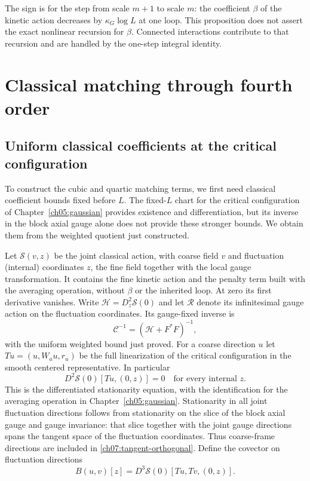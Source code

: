 The sign is for the step from scale $m+1$ to scale $m$: the coefficient $\beta$ of the
kinetic action decreases by $\kappa_G\log L$ at one loop.
This proposition does not assert the exact nonlinear recursion for
$\beta$. Connected interactions contribute to that recursion and are
handled by the one-step integral identity.

\section{Classical matching through fourth order}\label{ch07:classical}

\subsection{Uniform classical coefficients at the critical configuration}
\label{ch07:classical-uniform}

To construct the cubic and quartic matching terms, we first need
classical coefficient bounds fixed before $L$. The fixed-$L$ chart for the critical configuration of
Chapter~\ref{ch05:gaussian} provides existence and differentiation, but
its inverse in the block axial gauge alone does not provide these stronger bounds.
We obtain them from the weighted quotient just constructed.

Let $\mathscr S(v,z)$ be the joint classical action, with coarse field
$v$ and fluctuation (internal) coordinates $z$, the fine field together with the local gauge transformation. It contains the fine
kinetic action and the penalty term built with the averaging operation, without $\beta$ or the
inherited loop. At zero its first derivative vanishes. Write
$\mathscr H=D_z^2\mathscr S(0)$ and let $\mathcal R$ denote its
infinitesimal gauge action on the fluctuation coordinates. Its gauge-fixed inverse is
\[
 \mathscr C^{-1}=(\mathscr H+F^*F)^{-1},
\]
with the uniform weighted bound just proved. For a coarse direction $u$
let $T u=(u,W_a u,r_u)$ be the full linearization of the critical configuration in the smooth
centered representative. In particular
\begin{equation}\label{ch07:tangent-orthogonal}
 D^2\mathscr S(0)[Tu,(0,z)]=0
 \quad\text{for every internal }z.
\end{equation}
This is the differentiated stationarity equation, with the
identification for the averaging operation in Chapter~\ref{ch05:gaussian}. Stationarity
in all joint fluctuation directions follows from stationarity on the
slice of the block axial gauge and gauge invariance: that slice together with the joint
gauge directions spans the tangent space of the fluctuation coordinates. Thus coarse-frame
directions are included in \eqref{ch07:tangent-orthogonal}.
Define the covector on fluctuation directions
\[
 B(u,v)[z]=D^3\mathscr S(0)[Tu,Tv,(0,z)].
\]

